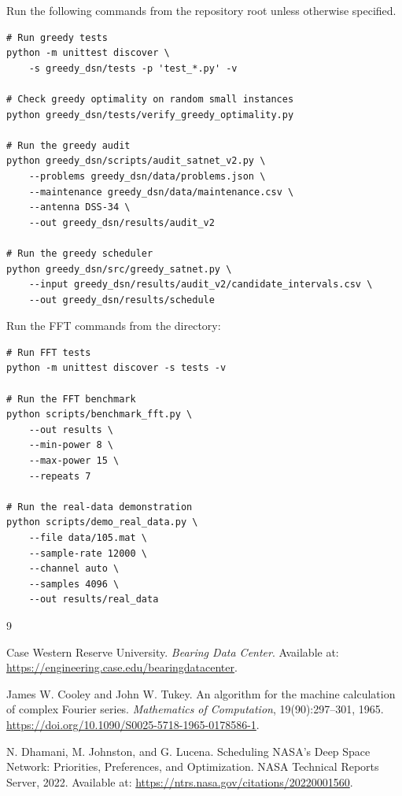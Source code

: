 \documentclass[conference]{IEEEtran}
\newcommand{\code}[1]{\texttt{\detokenize{#1}}}
\begin{document}
Run the following commands from the repository root unless otherwise
specified.

\begin{lstlisting}
# Run greedy tests
python -m unittest discover \
    -s greedy_dsn/tests -p 'test_*.py' -v

# Check greedy optimality on random small instances
python greedy_dsn/tests/verify_greedy_optimality.py

# Run the greedy audit
python greedy_dsn/scripts/audit_satnet_v2.py \
    --problems greedy_dsn/data/problems.json \
    --maintenance greedy_dsn/data/maintenance.csv \
    --antenna DSS-34 \
    --out greedy_dsn/results/audit_v2

# Run the greedy scheduler
python greedy_dsn/src/greedy_satnet.py \
    --input greedy_dsn/results/audit_v2/candidate_intervals.csv \
    --out greedy_dsn/results/schedule
\end{lstlisting}

Run the FFT commands from the \code{divide_conquer_fft} directory:

\begin{lstlisting}
# Run FFT tests
python -m unittest discover -s tests -v

# Run the FFT benchmark
python scripts/benchmark_fft.py \
    --out results \
    --min-power 8 \
    --max-power 15 \
    --repeats 7

# Run the real-data demonstration
python scripts/demo_real_data.py \
    --file data/105.mat \
    --sample-rate 12000 \
    --channel auto \
    --samples 4096 \
    --out results/real_data
\end{lstlisting}

\newpage

\begin{thebibliography}{9}

\bibitem{cwru}
Case Western Reserve University.
\newblock \emph{Bearing Data Center}.
\newblock Available at:
\url{https://engineering.case.edu/bearingdatacenter}.

James W. Cooley and John W. Tukey.
\newblock An algorithm for the machine calculation of complex Fourier series.
\newblock \emph{Mathematics of Computation}, 19(90):297--301, 1965.
\newblock \url{https://doi.org/10.1090/S0025-5718-1965-0178586-1}.

N. Dhamani, M. Johnston, and G. Lucena.
\newblock Scheduling NASA's Deep Space Network: Priorities, Preferences, and Optimization.
\newblock NASA Technical Reports Server, 2022.
\newblock Available at:
\url{https://ntrs.nasa.gov/citations/20220001560}.

\end{thebibliography}
\end{document}
